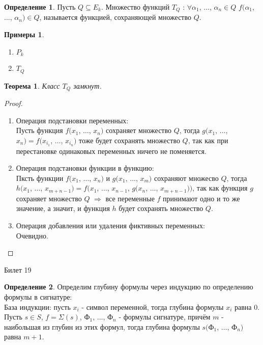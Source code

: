 \documentclass[a4paper, 12pt]{article}
\theoremstyle{definition}
\newtheorem*{definition}{Определение}
\newtheorem*{example}{Примеры}
\theoremstyle{plain}
\newtheorem*{theorem}{Теорема}
\theoremstyle{remark}
\begin{document}
  \begin{definition}
    Пусть $Q\subseteq E_k$. Множество функций $T_Q$ : $\forall \alpha_1$, $\ldots$, $\alpha_n\in Q$ $f(\alpha_1$, $\ldots$, $\alpha_n)\in Q$, называется функцией, сохраняющей множество $Q$.
  \end{definition}
  \begin{example}
    \begin{enumerate}
      \item $P_k$
      \item $T_Q$
    \end{enumerate}
  \end{example}
  \begin{theorem}
    Класс $T_Q$ замкнут.
  \end{theorem}
  \begin{proof}
    \begin{enumerate}
      \item Операция подстановки переменных:\\
      Пусть функция $f(x_1$, $\ldots$, $x_n)$ сохраняет множество $Q$, тогда $g(x_1$, $\ldots$, $x_n)=f(x_{i_1}$, $\ldots$, $x_{i_n})$ тоже будет сохранять множество $Q$, так как при перестановке одинаковых переменных ничего не поменяется.
      \item Операция подстановки функции в функцию:\\
      Пксть функции $f(x_1$, $\ldots$, $x_n)$ и $g(x_1$, $\ldots$, $x_m)$ сохраняют множесво $Q$, тогда $h(x_1$, $\ldots$, $x_{m+n-1})=f(x_1$, $\ldots$, $x_{n-1}$, $g(x_n$, $\ldots$, $x_{m+n-1}))$, так как функция $g$ сохраняет множество $Q$ $\Longrightarrow$ все переменные $f$ принимают одно и то же значение, а значит, и функция $h$ будет сохранять множество $Q$.
      \item Операция добавления или удаления фиктивных переменных:\\
      Очевидно.
    \end{enumerate}
  \end{proof}
  \begin{center}
    Билет 19
  \end{center}
  \begin{definition}
    Определим глубину формулы через индукцию по определению формулы в сигнатуре:\\
    База индукции: пусть $x_i$ - символ переменной, тогда глубина формулы $x_i$ равна 0.\\
    Пусть $s\in S$, $f=\Sigma(s)$, Ф$_1$, $\ldots$, Ф$_n$ - формулы сигнатуре, причём $m$ - наибольшая из глубин из этих формул, тогда глубина формулы $s($Ф$_1$, $\ldots$, Ф$_n)$ равна $m+1$.
  \end{definition}
\end{document}
